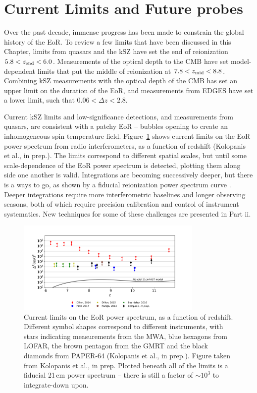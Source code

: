 \section{Current Limits and Future probes}
\label{sec:eor_intro_future}

Over the past decade, immense progress has been made to constrain the global history of the EoR. To review a few limits that have been discussed in this Chapter, limits from quasars and the kSZ have set the end of reionization $5.8 < z_{\rm end} < 6.0$. Measurements of the optical depth to the CMB have set model-dependent limits that put the middle of reionization at $7.8 < z_{\rm mid} < 8.8$. Combining kSZ measurements with the optical depth of the CMB has set an upper limit on the duration of the EoR, and measurements from EDGES have set a lower limit, such that $0.06 < \Delta z < 2.8$.

Current kSZ limits and low-significance detections, and measurements from quasars, are consistent with a patchy EoR -- bubbles opening to create an inhomogeneous spin temperature field. Figure~\ref{fig:eor_intro_pspec_limits} shows current limits on the EoR power spectrum from radio interferometers, as a function of redshift {\color{red} (Kolopanis et al., in prep.)}. The limits correspond to different spatial scales, but until some scale-dependence of the EoR power spectrum is detected, plotting them along side one another is valid. Integrations are becoming successively deeper, but there is a ways to go, as shown by a fiducial reionization power spectrum curve \citep{Mesinger.11}. Deeper integrations require more interferometric baselines and longer observing seasons, both of which require precision calibration and control of instrument systematics. New techniques for some of these challenges are presented in Part {\sc ii}.

\begin{figure}
\centering
\includegraphics[width=0.8\textwidth]{chapters/eor_intro/figures/eor_lowest_limits.png}
\caption[Current limits on the EoR power spectrum, as a function of redshift.]{Current limits on the EoR power spectrum, as a function of redshift. Different symbol shapes correspond to different instruments, with stars \citep{Dillon.14, Dillon.15, Beardsley.16} indicating measurements from the MWA, blue hexagons \citep{Patil.17} from LOFAR, the brown pentagon from the GMRT \citep{Paciga.13} and the black diamonds from PAPER-64 {\color{red} (Kolopanis et al., in prep.)}. Figure taken from {\color{red} Kolopanis et al., in prep}. Plotted beneath all of the limits is a fiducial 21\,cm power spectrum \citep{Mesinger.11} -- there is still a factor of $\sim 10^3$ to integrate-down upon.}
\label{fig:eor_intro_pspec_limits}
\end{figure}

